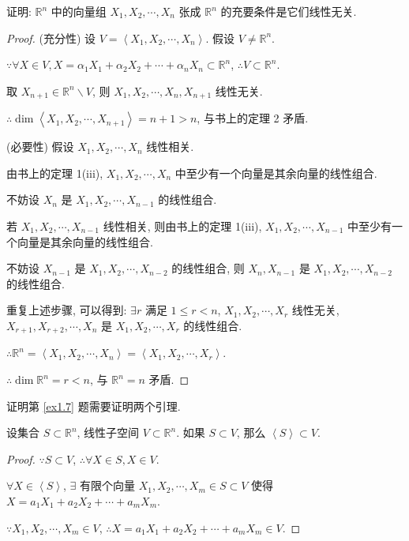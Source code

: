 \documentclass{ctexart}
\begin{document}
\addtocounter{exercise}{2}
\begin{exercise}%
    证明: $\mathbb{R}^n$ 中的向量组 $X_1,X_2,\cdots,X_n$ 张成 $\mathbb{R}^n$ 的充要条件是它们线性无关.
\end{exercise}
\begin{proof}
    (充分性) 设 $V=\left<X_1,X_2,\cdots,X_n\right>$. 假设 $V\neq\mathbb{R}^n$.

    $\because\forall X\in V,X=\alpha_1X_1+\alpha_2X_2+\cdots+\alpha_nX_n\subset\mathbb{R}^n$, $\therefore V\subset\mathbb{R}^n$.

    取 $X_{n+1}\in\mathbb{R}^n\backslash V$, 则 $X_1,X_2,\cdots,X_n,X_{n+1}$ 线性无关.

    $\therefore\dim\left<X_1,X_2,\cdots,X_{n+1}\right>=n+1>n$, 与书上的定理 2 矛盾.

    (必要性) 假设 $X_1,X_2,\cdots,X_n$ 线性相关.

    由书上的定理 1(iii), $X_1,X_2,\cdots,X_n$ 中至少有一个向量是其余向量的线性组合.
    
    不妨设 $X_n$ 是 $X_1,X_2,\cdots,X_{n-1}$ 的线性组合.

    若 $X_1,X_2,\cdots,X_{n-1}$ 线性相关, 则由书上的定理 1(iii), $X_1,X_2,\cdots,X_{n-1}$ 中至少有一个向量是其余向量的线性组合.

    不妨设 $X_{n-1}$ 是 $X_1,X_2,\cdots,X_{n-2}$ 的线性组合, 则 $X_n,X_{n-1}$ 是 $X_1,X_2,\cdots,X_{n-2}$ 的线性组合.

    重复上述步骤, 可以得到: $\exists r$ 满足 $1\leq r<n$, $X_1,X_2,\cdots,X_r$ 线性无关, $X_{r+1},X_{r+2},\cdots,X_n$ 是 $X_1,X_2,\cdots,X_r$ 的线性组合.

    $\therefore\mathbb{R}^n=\left<X_1,X_2,\cdots,X_n\right>=\left<X_1,X_2,\cdots,X_r\right>$.

    $\therefore\dim\mathbb{R}^n=r<n$, 与 $\mathbb{R}^n=n$ 矛盾.
\end{proof}
证明第 \ref{ex1.7} 题需要证明两个引理.
\begin{lemma}\label{l2.1}
    设集合 $S\subset\mathbb{R}^n$, 线性子空间 $V\subset\mathbb{R}^n$. 如果 $S\subset V$, 那么 $\left<S\right>\subset V$.
\end{lemma}
\begin{proof}
    $\because S\subset V$, $\therefore\forall X\in S,X\in V$.

    $\forall X\in\left<S\right>$, $\exists$ 有限个向量 $X_1,X_2,\cdots,X_m\in S\subset V$ 使得 $X=a_1X_1+a_2X_2+\cdots+a_mX_m$.

    $\because X_1,X_2,\cdots,X_m\in V$, $\therefore X=a_1X_1+a_2X_2+\cdots+a_mX_m\in V$.
\end{proof}
\end{document}
